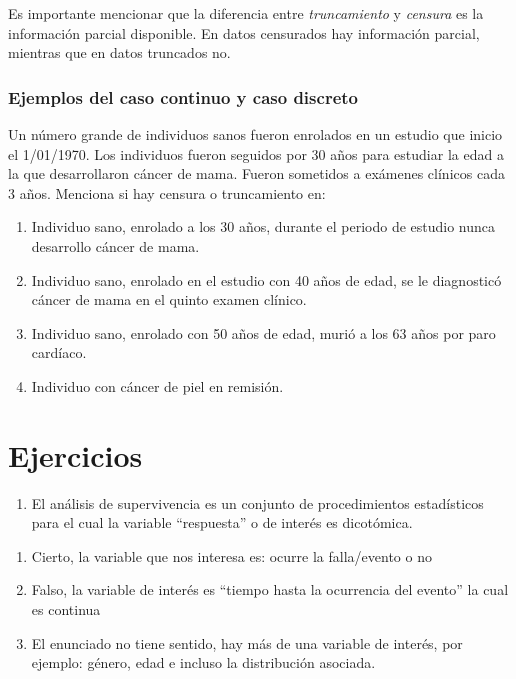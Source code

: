 \documentclass[
  a4paper,
  oneside,
  openany]{book}
\providecommand{\tightlist}{%
  \setlength{\itemsep}{0pt}\setlength{\parskip}{0pt}}
\begin{document}
Es importante mencionar que la diferencia entre \emph{truncamiento} y \emph{censura} es la información parcial disponible. En datos censurados hay información parcial, mientras que en datos truncados no.

\hypertarget{ejemplos-del-caso-continuo-y-caso-discreto}{%
\subsubsection*{Ejemplos del caso continuo y caso discreto}\label{ejemplos-del-caso-continuo-y-caso-discreto}}


Un número grande de individuos sanos fueron enrolados en un estudio que inicio el 1/01/1970. Los individuos fueron seguidos por 30 años para estudiar la edad a la que desarrollaron cáncer de mama. Fueron sometidos a exámenes clínicos cada 3 años. Menciona si hay censura o truncamiento en:

\begin{enumerate}
\def\labelenumi{\arabic{enumi}.}
\tightlist
\item
  Individuo sano, enrolado a los 30 años, durante el periodo de estudio nunca desarrollo cáncer de mama.
\item
  Individuo sano, enrolado en el estudio con 40 años de edad, se le diagnosticó cáncer de mama en el quinto examen clínico.
\item
  Individuo sano, enrolado con 50 años de edad, murió a los 63 años por paro cardíaco.
\item
  Individuo con cáncer de piel en remisión.
\end{enumerate}

\hypertarget{ejercicios}{%
\section{Ejercicios}\label{ejercicios}}

\begin{enumerate}
\def\labelenumi{\arabic{enumi}.}
\tightlist
\item
  El análisis de supervivencia es un conjunto de procedimientos estadísticos para el cual la variable ``respuesta'' o de interés es dicotómica.
\end{enumerate}

\begin{enumerate}
\def\labelenumi{\alph{enumi}.}
\tightlist
\item
  Cierto, la variable que nos interesa es: ocurre la falla/evento o no
\item
  Falso, la variable de interés es ``tiempo hasta la ocurrencia del evento'' la cual es continua
\item
  El enunciado no tiene sentido, hay más de una variable de interés, por ejemplo: género, edad e incluso la distribución asociada.
\end{enumerate}
\end{document}
